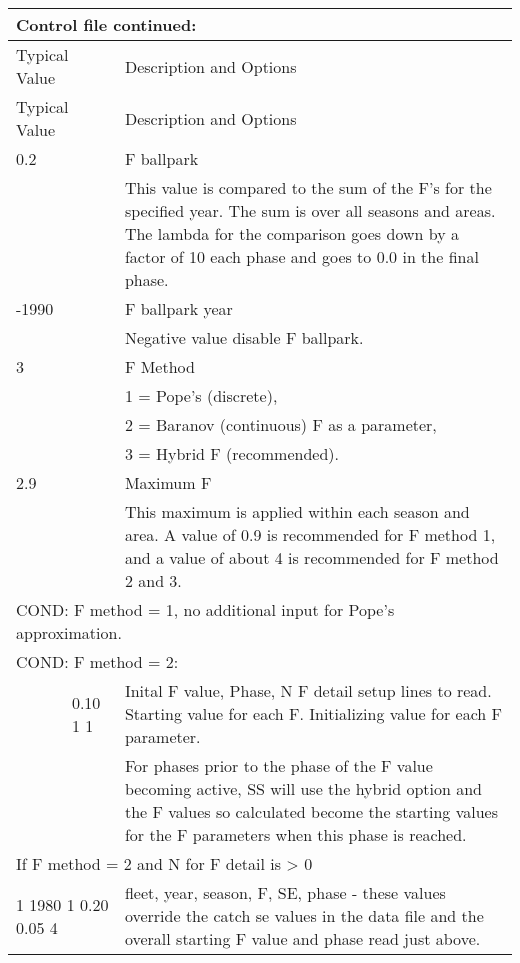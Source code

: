 \begin{longtable}{p{1cm} p{3cm} p{11cm}}
	\multicolumn{3}{l}{Control file continued:}\\
	\hline
	\multicolumn{2}{l}{Typical Value} & Description and Options\Tstrut\Bstrut\\
	\hline
	\endfirsthead

	\hline
	\multicolumn{2}{l}{Typical Value} & Description and Options\Tstrut\Bstrut\\
	\hline
	\endhead

	\hline
	\endfoot
	\endlastfoot

	0.2 \Tstrut & & F ballpark\\
	    & & This value is compared to the sum of the F’s for the specified year.  The sum is over all seasons and areas.  The lambda for the comparison goes down by a factor of 10 each phase and goes to 0.0 in the final phase.\Bstrut\\
   \hline

	-1990\Tstrut & & F ballpark year\\
	      & & Negative value disable F ballpark.\Bstrut\\
   \hline

	3 \Tstrut & & F Method \\
	   & & 1 = Pope's (discrete), \\
	   & & 2 = Baranov (continuous) F as a parameter, \\
	   & & 3 = Hybrid F (recommended).\Bstrut\\
   \hline

   2.9 \Tstrut & & Maximum F \\
       & & This maximum is applied within each season and area.   A value of 0.9 is recommended for F method 1, and a value of about 4 is recommended for F method 2 and 3. \Bstrut\\
   \hline

   \multicolumn{3}{l}{COND: F method = 1, no additional input for Pope's approximation.}\Tstrut\Bstrut\\
   \hline

   \multicolumn{3}{l}{COND: F method = 2: }\Tstrut\\
   & 0.10  1  1 & Inital F value, Phase, N F detail setup lines to read. Starting value for each F.  Initializing value for each F parameter.\\
   &  & For phases prior to the phase of the F value becoming active,  SS will use the hybrid option and the F values so calculated become the starting values for the F parameters when this phase is reached.\\		   
   \multicolumn{3}{l}{If F method = 2 and N for F detail is > 0}\Tstrut\\
   \multicolumn{2}{l}{1 1980 1 0.20 0.05 4} & fleet, year, season, F, SE, phase - these values override the catch se values in the data file and the overall starting F value and phase read just above.\Bstrut\\
   \hline


\end{longtable}
